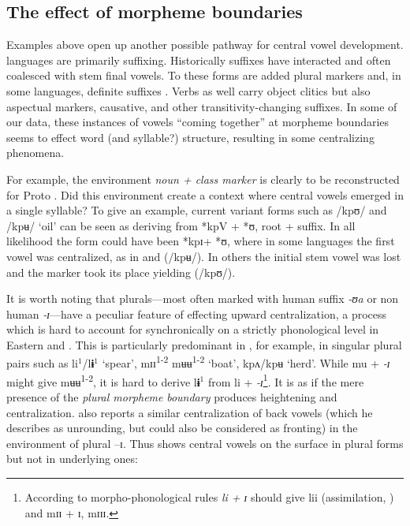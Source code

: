 \documentclass[output=paper
,newtxmath
,modfonts
,nonflat]{langsci/langscibook}
\begin{document}
\subsection{The effect of morpheme boundaries}\label{sec:zogbo:4.3} 

Examples above open up another possible pathway for central vowel development.  languages are primarily suffixing.  Historically  suffixes have interacted and often coalesced with stem final vowels. To these forms are added plural markers and, in some languages, definite suffixes \citep{Marchese1979/1983,Zogbo2017}.  Verbs as well carry object clitics but also aspectual markers, causative, and other transitivity-changing suffixes. In some of our data, these instances of vowels “coming together” at morpheme boundaries seems to effect word (and syllable?) structure, resulting in some centralizing phenomena. 

For example, the environment \textit{noun + class marker} is clearly to be reconstructed for Proto .  Did this environment create a context where central vowels emerged in a single syllable?  To give an example, current variant forms such as /kpʊ/ and /kpʉ/ ‘oil’ can be seen as deriving from *kpV + *ʊ, root +  suffix. In all likelihood the form could have been *kpɪ+ *ʊ, where in some languages the first vowel was centralized, as in  and  (/kpʉ/). In others the initial stem vowel was lost and the  marker took its place yielding (/kpʊ/).

It is worth noting that  plurals—most often marked with human suffix \textit{{}-ʊa} or non human \textit{{}-ɪ}—have a peculiar feature of effecting upward centralization, a process which is hard to account for synchronically on a strictly phonological level in Eastern  and  \citep{Marchese1979/1983}. This is particularly predominant in , for example, in singular plural pairs such as li$^1$/l\textbf{ɨ}$^1$ ‘spear’, mɪɪ\textsuperscript{1-2} mʉʉ\textsuperscript{1-2} ‘boat’, kpʌ/kpʉ ‘herd’.  While mu + \textit{{}-ɪ} might give mʉʉ\textsuperscript{1-2}, it is hard to derive l\textbf{ɨ}$^1$ from li + \textit{{}-ɪ}\footnote{According to morpho-phonological rules \textit{li + ɪ} should give lii (assimilation, ) and mɪɪ + ɪ, mɪɪɪ.}. It is as if the mere presence of the \textit{plural morpheme} \textit{boundary} produces heightening and centralization. \citet{Goprou2014} also reports a similar centralization of back vowels (which he describes as unrounding, but could also be considered as fronting) in the environment of plural –ɪ. Thus  shows central vowels on the surface in plural forms but not in underlying ones:
\end{document}
